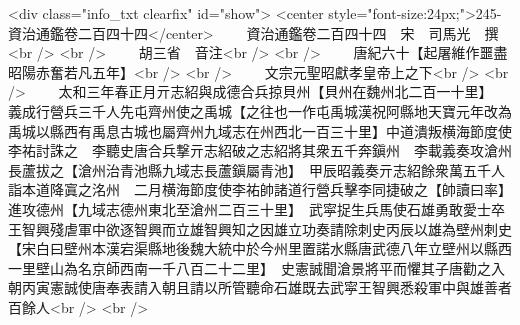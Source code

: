 <div class="info_txt clearfix" id="show">
<center style="font-size:24px;">245-資治通鑑卷二百四十四</center>
  　　資治通鑑卷二百四十四　宋　司馬光　撰<br />
<br />
　　胡三省　音注<br />
<br />
　　唐紀六十【起屠維作噩盡昭陽赤奮若凡五年】<br />
<br />
　　文宗元聖昭獻孝皇帝上之下<br />
<br />
　　太和三年春正月亓志紹與成德合兵掠貝州【貝州在魏州北二百一十里】　義成行營兵三千人先屯齊州使之禹城【之往也一作屯禹城漢祝阿縣地天寶元年改為禹城以縣西有禹息古城也屬齊州九域志在州西北一百三十里】中道潰叛横海節度使李祐討誅之　李聽史唐合兵撃亓志紹破之志紹將其衆五千奔鎭州　李載義奏攻滄州長蘆拔之【滄州治青池縣九域志長蘆鎭屬青池】　甲辰昭義奏亓志紹餘衆萬五千人詣本道降寘之洺州　二月横海節度使李祐帥諸道行營兵擊李同捷破之【帥讀曰率】進攻德州【九域志德州東北至滄州二百三十里】　武寜捉生兵馬使石雄勇敢愛士卒王智興殘虐軍中欲逐智興而立雄智興知之因雄立功奏請除刺史丙辰以雄為壁州刺史【宋白曰壁州本漢宕渠縣地後魏大統中於今州里置諾水縣唐武德八年立壁州以縣西一里壁山為名京師西南一千八百二十二里】　史憲誠聞滄景將平而懼其子唐勸之入朝丙寅憲誠使唐奉表請入朝且請以所管聽命石雄既去武寜王智興悉殺軍中與雄善者百餘人<br />
<br />
